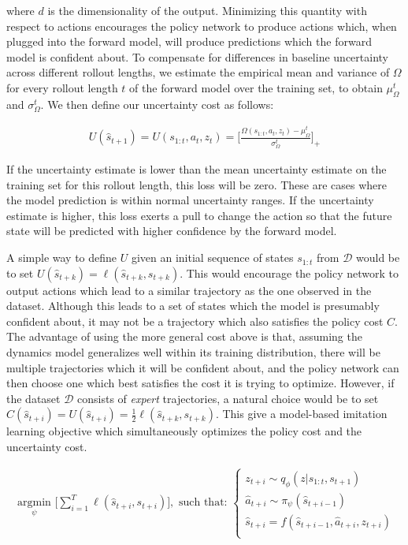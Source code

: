 \documentclass{article} %
\begin{document}
where $d$ is the dimensionality of the output. Minimizing this quantity with respect to actions encourages the policy network to produce actions which, when plugged into the forward model, will produce predictions which the forward model is confident about.
    To compensate for differences in baseline uncertainty across different rollout lengths, we estimate the empirical mean and variance of $\Omega$ for every rollout length $t$ of the forward model over the training set, to obtain $\mu_{\Omega}^t$ and $\sigma_{\Omega}^t$. We then define our uncertainty cost as follows:

    \begin{align}
      U(\hat{s}_{t+1}) = U(s_{1:t}, a_t, z_t) = \Big [ \frac{\Omega(s_{1:t}, a_t, z_t) - \mu_\Omega^t}{\sigma_\Omega^t} \Big]_+
    \end{align}

    If the uncertainty estimate is lower than the mean uncertainty estimate on the training set for this rollout length, this loss will be zero.
    These are cases where the model prediction is within normal uncertainty ranges. If the uncertainty estimate is higher, this loss exerts a pull to change the action so that the future state will be predicted with higher confidence by the forward model.



A simple way to define $U$ given an initial sequence of states $s_{1:t}$ from $\mathcal{D}$ would be to set $U(\hat{s}_{t+k}) = \ell(\hat{s}_{t+k}, s_{t+k})$.
This would encourage the policy network to output actions which lead to a similar trajectory as the one observed in the dataset.
Although this leads to a set of states which the model is presumably confident about, it may not be a trajectory which also satisfies the policy cost $\textit{C}$.
The advantage of using the more general cost above is that, assuming the dynamics model generalizes well within its training distribution, there will be multiple trajectories which it will be confident about, and the policy network can then choose one which best satisfies the cost it is trying to optimize.
However, if the dataset $\mathcal{D}$ consists of \textit{expert} trajectories, a natural choice would be to set $C(\hat{s}_{t+i}) = U(\hat{s}_{t+i}) = \frac{1}{2} \ell(\hat{s}_{t+k}, s_{t+k})$. This give a model-based imitation learning objective which simultaneously optimizes the policy cost and the uncertainty cost.


        \begin{align*}
    \underset{\psi}{\mbox{ argmin }} \Big[ \sum_{i=1}^{T} \ell(\hat{s}_{t+i}, s_{t+i}) \Big],  \mbox{ such that: }
    \begin{cases}
      z_{t+i} \sim q_\phi(z | s_{1:t}, s_{t+1}) \\
      \hat{a}_{t+i} \sim \pi_\psi(\hat{s}_{t+i-1}) \\
      \hat{s}_{t+i} = f(\hat{s}_{t+i-1}, \hat{a}_{t+i}, z_{t+i}) \\
      \end{cases}
        \end{align*}
\end{document}
